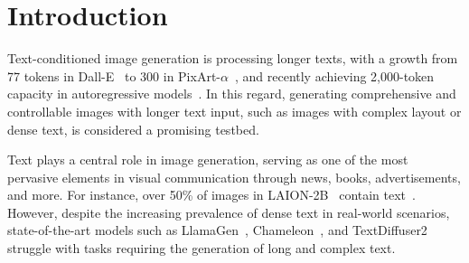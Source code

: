 \section{Introduction}

Text-conditioned image generation is processing longer texts, with a growth from 77 tokens in Dall-E~\cite{dalle} to 300 in PixArt-$\alpha$~\cite{pixarta}, and recently achieving 2,000-token capacity in autoregressive models~\cite{chameleon}. 
In this regard, generating comprehensive and controllable images with longer text input, such as images with complex layout or dense text, is considered a promising testbed.




Text plays a central role in image generation, serving as one of the most pervasive elements in visual communication through news, books, advertisements, and more. 
For instance, over 50\% of images in LAION-2B~\cite{laion} contain text~\cite{parrot}. 
However, despite the increasing prevalence of dense text in real-world scenarios, state-of-the-art models such as LlamaGen~\cite{llamagen}, Chameleon~\cite{chameleon}, and TextDiffuser2~\cite{textdiffuser2} struggle with tasks requiring the generation of long and complex text. 



